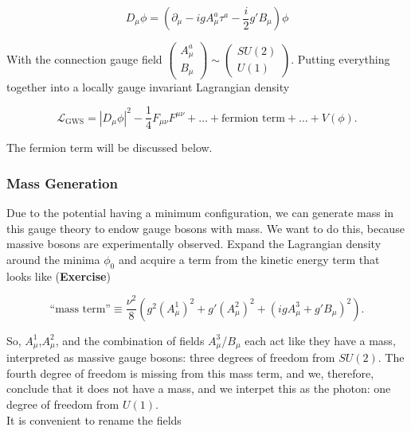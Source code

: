 \documentclass[10pt]{article}
\begin{document}
\begin{equation}
D_\mu \phi = (\partial_\mu - i g A_\mu^a \tau^a - \frac{i}{2} g' B_\mu ) \phi
\end{equation}

\noindent With the connection gauge field $\begin{pmatrix} A_\mu^a \\ B_\mu \end{pmatrix} \sim \begin{pmatrix} SU(2) \\ U(1) \end{pmatrix}$. Putting everything together into a locally gauge invariant Lagrangian density

\begin{equation}
\mathcal{L}_{\text{GWS}} = |D_\mu \phi|^2 - \frac{1}{4}F_{\mu\nu}F^{\mu\nu} + \dots + \text{fermion term} + \dots + V(\phi).
\end{equation}

\noindent The fermion term will be discussed below. \\

\subsubsection*{Mass Generation}

\noindent Due to the potential having a minimum configuration, we can generate mass in this gauge theory to endow gauge bosons with mass. We want to do this, because massive bosons are experimentally observed. Expand the Lagrangian density around the minima $\phi_0$ and acquire a term from the kinetic energy term that looks like (\textbf{Exercise})

\begin{equation}
\text{``mass term''} \equiv \frac{\nu^2}{8} \left( g^2 (A_\mu^1)^2 + g' (A_\mu^2)^2 + (ig A_\mu^3 + g' B_\mu)^2 \right).
\end{equation}

\noindent So, $A_\mu^1$,$ A_\mu^2$, and the combination of fields $A_\mu^3$/$B_\mu$ each act like they have a mass, interpreted as massive gauge bosons: three degrees of freedom from $SU(2)$. The fourth degree of freedom is missing from this mass term, and we, therefore, conclude that it does not have a mass, and we interpet this as the photon: one degree of freedom from $U(1)$. \\

\noindent It is convenient to rename the fields
\end{document}

